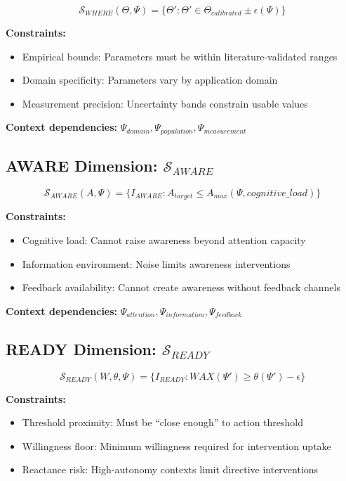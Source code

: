 \begin{equation}
\mathcal{S}_{WHERE}(\Theta, \Psi) = \{\Theta' : \Theta' \in \Theta_{calibrated} \pm \epsilon(\Psi)\}
\end{equation}

\textbf{Constraints:}
\begin{itemize}
    \item Empirical bounds: Parameters must be within literature-validated ranges
    \item Domain specificity: Parameters vary by application domain
    \item Measurement precision: Uncertainty bands constrain usable values
\end{itemize}

\textbf{Context dependencies:} $\Psi_{domain}, \Psi_{population}, \Psi_{measurement}$

\subsection{AWARE Dimension: $\mathcal{S}_{AWARE}$}

\begin{equation}
\mathcal{S}_{AWARE}(A, \Psi) = \{I_{AWARE} : A_{target} \leq A_{max}(\Psi, cognitive\_load)\}
\end{equation}

\textbf{Constraints:}
\begin{itemize}
    \item Cognitive load: Cannot raise awareness beyond attention capacity
    \item Information environment: Noise limits awareness interventions
    \item Feedback availability: Cannot create awareness without feedback channels
\end{itemize}

\textbf{Context dependencies:} $\Psi_{attention}, \Psi_{information}, \Psi_{feedback}$

\subsection{READY Dimension: $\mathcal{S}_{READY}$}

\begin{equation}
\mathcal{S}_{READY}(W, \theta, \Psi) = \{I_{READY} : WAX(\Psi') \geq \theta(\Psi') - \epsilon\}
\end{equation}

\textbf{Constraints:}
\begin{itemize}
    \item Threshold proximity: Must be ``close enough'' to action threshold
    \item Willingness floor: Minimum willingness required for intervention uptake
    \item Reactance risk: High-autonomy contexts limit directive interventions
\end{itemize}

